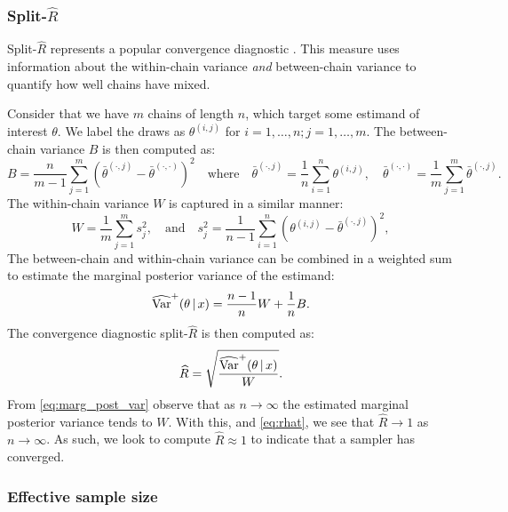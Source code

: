 \subsubsection{Split-$\widehat{R}$}

Split-$\widehat{R}$ represents a popular convergence diagnostic \parencite{gelman13}. This
measure uses information about the within-chain variance \emph{and} between-chain variance
to quantify how well chains have mixed.

Consider that we have $m$ chains of length $n$, which target some estimand of interest
$\theta$. We label the draws as $\theta^{(i, j)}$ for $i=1,\ldots,n; j=1,\ldots,m$. The
between-chain variance $B$ is then computed as:
\begin{equation*}
  B = \frac{n}{m - 1} \sum_{j=1}^m (\bar{\theta}^{(\cdot, j)} - \bar{\theta}^{(\cdot,\cdot)})^2
    \quad \text{where} \quad
    \bar{\theta}^{(\cdot, j)} = \frac{1}{n} \sum_{i=1}^{n} \theta^{(i, j)},
    \quad
    \bar{\theta}^{(\cdot, \cdot)} = \frac{1}{m} \sum_{j=1}^m \bar{\theta}^{(\cdot, j)}.
\end{equation*}
The within-chain variance $W$ is captured in a similar manner:
\begin{equation*}
  W = \frac{1}{m} \sum_{j=1}^m s_j^2,
    \quad \text{and} \quad
    s_j^2 = \frac{1}{n-1} \sum_{i=1}^{n}(\theta^{(i, j)} - \bar{\theta}^{(\cdot,j)})^2,
\end{equation*}
The between-chain and within-chain variance can be combined in a weighted sum to estimate
the marginal posterior variance of the estimand:
\begin{equation}
  \label{eq:marg_post_var}
  \widehat{\text{Var}}^+ (\theta \,|\, x) = \frac{n-1}{n} W + \frac{1}{n} B.
\end{equation}
The convergence diagnostic split-$\widehat{R}$ is then computed as:
\begin{equation}
  \label{eq:rhat}
  \widehat{R} = \sqrt{\frac{\widehat{\text{Var}}^+ (\theta \,|\, x)}{W}}.
\end{equation}
From \cref{eq:marg_post_var} observe that as $n\rightarrow\infty$ the estimated marginal
posterior variance tends to $W$. With this, and \cref{eq:rhat}, we see that
$\widehat{R}\rightarrow1$ as $n\rightarrow\infty$. As such, we look to compute
$\widehat{R}\approx1$ to indicate that a sampler has converged.

\subsubsection{Effective sample size}

